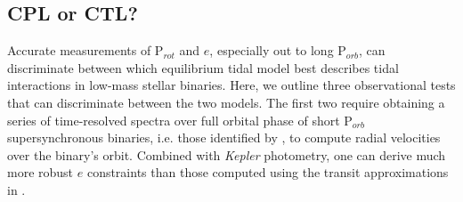 \documentclass[twocolumn]{aastex61}
\newcommand{\kepler}[0]{\textit{Kepler}\xspace}
\begin{document}




\subsection{CPL or CTL?} \label{sec:whichModel}

Accurate measurements of P$_{rot}$ and $e$, especially out to long P$_{orb}$, can discriminate between which equilibrium tidal model best describes tidal interactions in low-mass stellar binaries. Here, we outline three observational tests that can discriminate between the two models.  The first two require obtaining a series of time-resolved spectra over full orbital phase of short P$_{orb}$ supersynchronous binaries, i.e. those identified by \citet{Lurie2017}, to compute radial velocities over the binary's orbit.  Combined with \kepler photometry, one can derive much more robust $e$ constraints than those computed using the transit approximations in \citet{Lurie2017}. 
\end{document}
